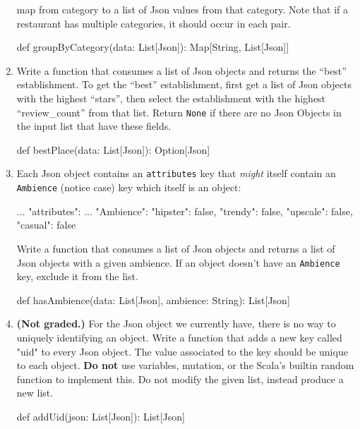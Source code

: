 \begin{enumerate}
    map from category to a list of Json values from that category. Note that if
    a restaurant has multiple categories, it should occur in each pair.
    \begin{scalacode}
    def groupByCategory(data: List[Json]): Map[String, List[Json]]
    \end{scalacode}
    \item Write a function that consumes a list of Json objects and returns the
    ``best'' establishment. To get the ``best'' establishment, first get a list
    of Json objects with the highest ``stars'', then select the establishment
    with the highest ``review\_count'' from that list. Return \texttt{None}
    if there are no Json Objects in the input list that have these fields.
    \begin{scalacode}
    def bestPlace(data: List[Json]): Option[Json]
    \end{scalacode}
    \item Each Json object contains an \texttt{attributes} key that
    \textit{might} itself contain an \texttt{Ambience} (notice case) key which
    itself is an object:
    \begin{scalacode}
    {   ...
        "attributes": {
            ...
            "Ambience": {
                "hipster": false,
                "trendy": false,
                "upscale": false,
                "casual": false
            }
        }
    }
    \end{scalacode}
    Write a function that consumes a list of Json objects and returns a list
    of Json objects with a given ambience. If an object doesn't have an
    \texttt{Ambience} key, exclude it from the list.
    \begin{scalacode}
    def hasAmbience(data: List[Json], ambience: String): List[Json]
    \end{scalacode}
    \item \textbf{(Not graded.)} For the Json object we currently have, there
    is no way to uniquely identifying an object. Write a function that adds a
    new key called "uid" to every Json object. The value associated to the
    key should be unique to each object. \textbf{Do not} use variables,
    mutation, or the Scala's builtin random function to implement this. Do not
    modify the given list, instead produce a new list.
    \begin{scalacode}
    def addUid(json: List[Json]): List[Json]
    \end{scalacode}

\end{enumerate}

